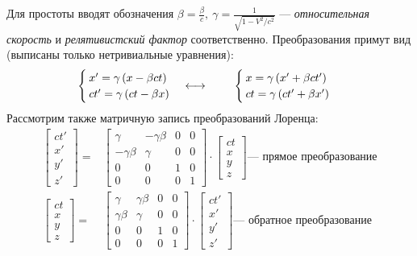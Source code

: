     Для простоты вводят обозначения $\displaystyle \beta = \frac{\beta}{c}, \ \gamma = \frac{1}{\sqrt{1 - V^2 \big/ c^2}}$ --- \textit{относительная скорость} и \textit{релятивистский фактор} соответственно. Преобразования примут вид (выписаны только нетривиальные уравнения):
    \[
        \begin{cases}
            x' = \gamma\left({x - \beta c t}\right) \\
            ct' = \gamma\left({ct - \beta x}\right)
        \end{cases}
        \longleftrightarrow \hspace{0.8 cm}
        \begin{cases}
            x = \gamma\left({x' + \beta c t'}\right) \\
            ct = \gamma\left({ct' + \beta x'}\right)
        \end{cases}
    \]
    Рассмотрим также матричную запись преобразований Лоренца:
    \[
    \begin{aligned}
        \begin{bmatrix} ct' \\ x' \\ y' \\ z' \end{bmatrix}
            = &
        \begin{bmatrix}
            \gamma & -\gamma \beta & 0 & 0 \\
            -\gamma \beta & \gamma & 0 & 0 \\
            0 & 0 & 1 & 0 \\
            0 & 0 & 0 & 1
        \end{bmatrix}
        \cdot 
        \begin{bmatrix} ct \\ x \\ y \\ z \end{bmatrix}
        \textrm{--- прямое преобразование} \\
        \begin{bmatrix} ct \\ x \\ y \\ z \end{bmatrix}
            = &
        \begin{bmatrix}
            \gamma & \gamma \beta & 0 & 0 \\
            \gamma \beta & \gamma & 0 & 0 \\
            0 & 0 & 1 & 0 \\
            0 & 0 & 0 & 1
        \end{bmatrix}
        \cdot 
        \begin{bmatrix} ct' \\ x' \\ y' \\ z' \end{bmatrix}
        \textrm{--- обратное преобразование}
    \end{aligned}
    \]

